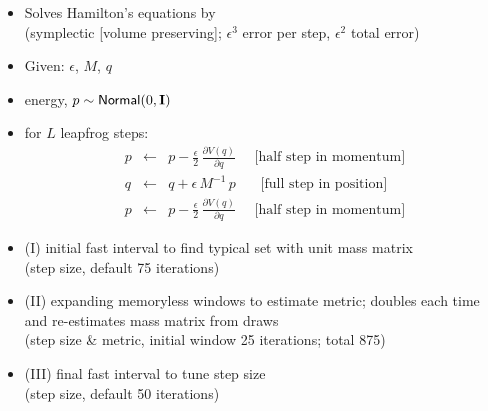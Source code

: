 \documentclass[10pt]{report}
\begin{document}
%
\begin{itemize}
\item Solves Hamilton's equations by 
  \\
  {\footnotesize (symplectic [volume preserving]; $\epsilon^3$ error per step, $\epsilon^2$ total error)}
\item Given:  $\epsilon$,  $M$,  $q$
\item {} energy, $p \sim {\sf
    Normal}(0,\mbox{\bf I})$
\item {} for $L$ leapfrog steps:
  \begin{eqnarray*}
    p & \leftarrow &
    p - \frac{\epsilon}{2} \, \frac{\partial V(q)}{\partial q}
    \ \ \ \ \ \ \mbox{[half step in momentum]}
    \\[6pt]
    q & \leftarrow &
    q + \epsilon \, M^{-1} \, p
    \ \ \ \ \ \ \ \  \mbox{[full step in position]}
    \\[6pt]
    p & \leftarrow &
    p - \frac{\epsilon}{2} \, \frac{\partial V(q)}{\partial q}
    \ \ \ \ \ \ \mbox{[half step in momentum]}
  \end{eqnarray*}
\end{itemize}


%
\begin{itemize}
\item (I) initial fast interval to find typical set with unit mass matrix
\\
(step size,   default 75 iterations)
\item (II) expanding memoryless windows to estimate metric; doubles each time and re-estimates mass matrix from draws
\\
(step size \& metric, initial window 25 iterations; total 875)
\item (III) final fast interval to tune step size
  \\
  (step size, default 50 iterations)
\end{itemize}
\end{document}
